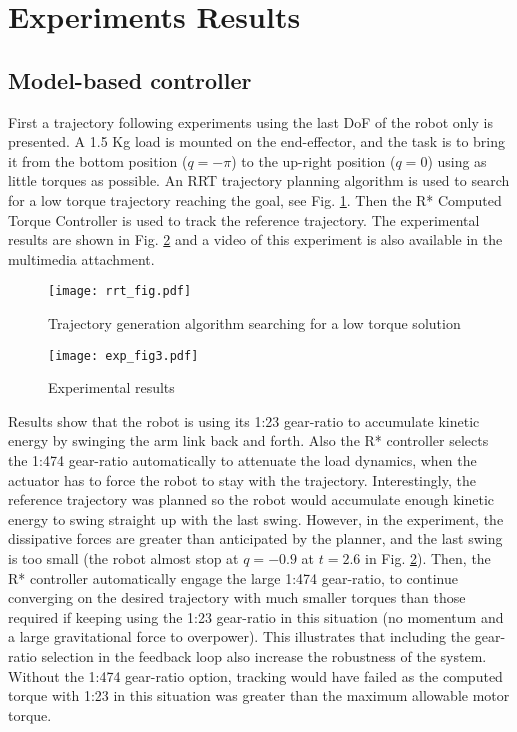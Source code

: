 

\section{Experiments Results}
\label{sec:shift_exp}

\subsection{Model-based controller}

First a trajectory following experiments using the last DoF of the robot only is presented. A 1.5 Kg load is mounted on the end-effector, and the task is to bring it from the bottom position ($q=-\pi$) to the up-right position ($q=0$) using as little torques as possible. An RRT trajectory planning algorithm is used to search for a low torque trajectory reaching the goal, see Fig. \ref{fig:exp_rrt}. Then the R* Computed Torque Controller is used to track the reference trajectory. The experimental results are shown in Fig. \ref{fig:exp_traj} and a video of this experiment is also available in the multimedia attachment. 
%
\begin{figure}[htp]
	\centering
		\texttt{[image: rrt\_fig.pdf]}
	\caption{Trajectory generation algorithm searching for a low torque solution}
	\label{fig:exp_rrt}
\end{figure}
%
\begin{figure}[htp]
	\centering
		\texttt{[image: exp\_fig3.pdf]}
	\caption{Experimental results}
	\label{fig:exp_traj}
	\vspace{-10pt}
\end{figure}
%
Results show that the robot is using its 1:23 gear-ratio to accumulate kinetic energy by swinging the arm link back and forth. Also the R* controller selects the 1:474 gear-ratio automatically to attenuate the load dynamics, when the actuator has to force the robot to stay with the trajectory.  Interestingly, the reference trajectory was planned so the robot would accumulate enough kinetic energy to swing straight up with the last swing. However, in the experiment, the dissipative forces are greater than anticipated by the planner, and the last swing is too small (the robot almost stop at $q=-0.9$ at $t=2.6$ in Fig. \ref{fig:exp_traj}). Then, the R* controller automatically engage the large 1:474 gear-ratio, to continue converging on the desired trajectory with much smaller torques than those required if keeping using the 1:23 gear-ratio in this situation (no momentum and a large gravitational force to overpower). This illustrates that including the gear-ratio selection in the feedback loop also increase the robustness of the system. Without the 1:474 gear-ratio option, tracking would have failed as the computed torque with 1:23 in this situation was greater than the maximum allowable motor torque.

